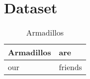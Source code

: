 \chapter{Dataset}

\begin{table}
\caption{Armadillos}
\label{arm:table}
\begin{center}
\begin{tabular}{||l|l||}\hline
Armadillos & are \\\hline
our	   & friends \\\hline
\end{tabular}
\end{center}
\end{table}

